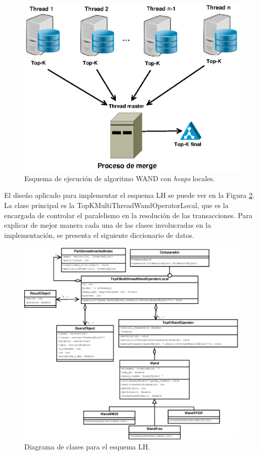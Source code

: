 \begin{figure}[!ht]
\centering
\includegraphics[scale=.75]{images/wand_heaps_locales.eps}
\caption{Esquema de ejecución de algoritmo WAND con \textit{heaps} locales.}
\label{fig:wand-heap-local}
\end{figure}

El diseño aplicado para implementar el esquema LH se puede ver en la Figura \ref{fig:TopKMultiThreadWandOperatorLocal}. La clase principal es la TopKMultiThreadWandOperatorLocal, que es la encargada de controlar el paralelismo en la resolución de las transacciones. Para explicar de mejor manera cada una de las clases involucradas en la implementación, se presenta el siguiente diccionario de datos.

\begin{figure}[!ht]
\centering
\includegraphics[scale=.75]{images/TopKMultiThreadWandOperatorLocal.eps}
\caption{Diagrama de clases para el esquema LH.}
\label{fig:TopKMultiThreadWandOperatorLocal}
\end{figure}

